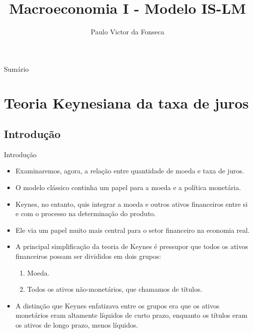 \documentclass[10pt]{beamer}
\title[]{Macroeconomia I - Modelo IS-LM}
\author[]{Paulo Victor da Fonseca}
\date{}
\begin{document}
\begin{frame}[plain]
\end{frame}

\begin{frame}{Sumário}
    \tableofcontents
\end{frame}

\section{Teoria Keynesiana da taxa de juros}
\subsection{Introdução}
\begin{frame}{Introdução}
    \begin{itemize}
        \item Examinaremos, agora, a relação entre quantidade de moeda e taxa de juros.
        \bigskip
        \item O modelo clássico continha um papel para a moeda e a política monetária.
        \bigskip
        \item Keynes, no entanto, quis integrar a moeda e outros ativos financeiros entre si e com o processo na determinação do produto.
        \bigskip
        \item Ele via um papel muito mais central para o setor financeiro na economia real.
        \bigskip
        \item A principal simplificação da teoria de Keynes é pressupor que todos os ativos financeiros possam ser divididos em dois grupos:
        \bigskip
        \begin{enumerate}
            \item Moeda.
            \bigskip
            \item Todos os ativos não-monetários, que chamamos de títulos.
        \end{enumerate}
        \bigskip
        \item A distinção que Keynes enfatizava entre os grupos era que os ativos monetários eram altamente líquidos de curto prazo, enquanto os títulos eram os ativos de longo prazo, menos líquidos.
    \end{itemize}
\end{frame}
\end{document}
